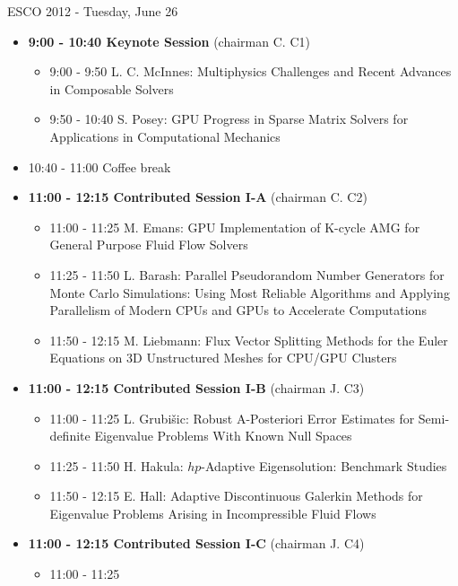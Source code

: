 \documentclass[10pt, A4]{article}%
\begin{document}
\newpage

\centerline{\huge ESCO 2012 - Tuesday, June 26}
\vspace{4mm}

\begin{itemize}    
  \item {\bf 9:00 - 10:40 Keynote Session} (chairman C. C1) 
  \begin{itemize}
    \item 9:00 - 9:50 L. C. McInnes: Multiphysics Challenges and Recent Advances in Composable Solvers
    \item 9:50 - 10:40 S. Posey: GPU Progress in Sparse Matrix Solvers for Applications in Computational Mechanics
  \end{itemize}
  \item 10:40 - 11:00 Coffee break
  \item {\bf 11:00 - 12:15 Contributed Session I-A} (chairman C. C2) 
  \begin{itemize}
    \item 11:00 - 11:25 M. Emans: GPU Implementation of K-cycle AMG for General Purpose Fluid Flow Solvers
    \item 11:25 - 11:50 L. Barash: Parallel Pseudorandom Number Generators for Monte Carlo Simulations: Using Most Reliable Algorithms and Applying Parallelism
of Modern CPUs and GPUs to Accelerate Computations
    \item 11:50 - 12:15 M. Liebmann: Flux Vector Splitting Methods for the Euler Equations on 3D Unstructured Meshes for CPU/GPU Clusters
  \end{itemize}
  \item {\bf 11:00 - 12:15 Contributed Session I-B} (chairman J. C3) 
  \begin{itemize}
    \item 11:00 - 11:25 L. Grubi\v{s}ic: Robust A-Posteriori Error Estimates for Semi-definite Eigenvalue Problems With Known Null Spaces
    \item 11:25 - 11:50 H. Hakula: $hp$-Adaptive Eigensolution: Benchmark Studies
    \item 11:50 - 12:15 E. Hall: Adaptive Discontinuous Galerkin Methods for Eigenvalue Problems Arising in Incompressible Fluid Flows
  \end{itemize}
  \item {\bf 11:00 - 12:15 Contributed Session I-C} (chairman J. C4) 
  \begin{itemize}
    \item 11:00 - 11:25 

\end{itemize}
\end{itemize}
\end{document}
